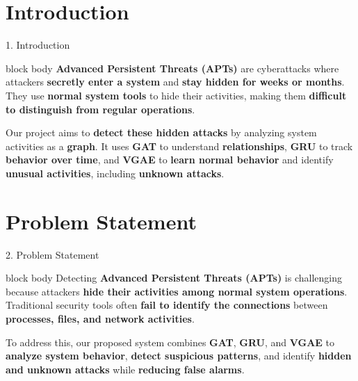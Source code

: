 \documentclass[aspectratio=169,10pt]{beamer}
\begin{document}
\section{Introduction}

\begin{frame}{1. Introduction}
\vspace{0.6em}
\begin{beamercolorbox}[rounded=true,shadow=false,sep=0.85em,wd=\textwidth]{block body}
\fontsize{9.3pt}{14.8pt}\selectfont
\textbf{Advanced Persistent Threats (APTs)} are cyberattacks where attackers \textbf{secretly enter a system} and \textbf{stay hidden for weeks or months}. They use \textbf{normal system tools} to hide their activities, making them \textbf{difficult to distinguish from regular operations}.

\vspace{0.5em}
Our project aims to \textbf{detect these hidden attacks} by analyzing system activities as a \textbf{graph}. It uses \textbf{GAT} to understand \textbf{relationships}, \textbf{GRU} to track \textbf{behavior over time}, and \textbf{VGAE} to \textbf{learn normal behavior} and identify \textbf{unusual activities}, including \textbf{unknown attacks}.
\end{beamercolorbox}
\end{frame}

\section{Problem Statement}

\begin{frame}{2. Problem Statement}
\vspace{0.6em}
\begin{beamercolorbox}[rounded=true,shadow=false,sep=0.85em,wd=\textwidth]{block body}
\fontsize{9.3pt}{14.8pt}\selectfont
Detecting \textbf{Advanced Persistent Threats (APTs)} is challenging because attackers \textbf{hide their activities among normal system operations}. Traditional security tools often \textbf{fail to identify the connections} between \textbf{processes, files, and network activities}.

\vspace{0.5em}
To address this, our proposed system combines \textbf{GAT}, \textbf{GRU}, and \textbf{VGAE} to \textbf{analyze system behavior}, \textbf{detect suspicious patterns}, and identify \textbf{hidden and unknown attacks} while \textbf{reducing false alarms}.
\end{beamercolorbox}
\end{frame}
\end{document}
